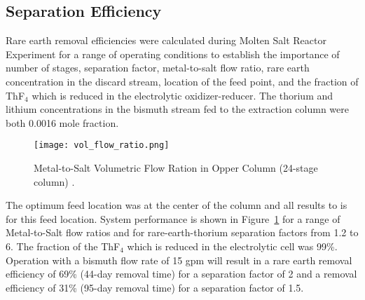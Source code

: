 \subsection{Separation Efficiency}
Rare earth removal efficiencies were calculated during Molten Salt Reactor Experiment for a range of operating conditions to establish the importance of number of stages, separation factor, metal-to-salt flow ratio, rare earth concentration in the discard stream, location of the feed point, and the fraction of ThF$_4$ which is reduced in the electrolytic oxidizer-reducer. The thorium and lithium concentrations in the bismuth stream fed to the extraction column were both 0.0016 mole fraction. 
\begin{figure}[htbp!]
    \begin{center}
        \texttt{[image: vol\_flow\_ratio.png]}
    \end{center}
    \caption{Metal-to-Salt Volumetric Flow Ration in Opper Column (24-stage column) \cite{briggs_molten-salt_1969}.}
    \label{fig:vol-flow-ratio}
\end{figure}

The optimum feed location was at the center of the column and all results to is for this feed
location. System performance is shown in Figure~\ref{fig:vol-flow-ratio} for a range of Metal-to-Salt flow ratios and for rare-earth-thorium separation factors from 1.2 to 6. The fraction of the ThF$_4$ which is reduced in the electrolytic cell was 99\%. Operation with a bismuth flow rate of 15 gpm will result in a rare earth removal efficiency of 69\% (44-day removal time) for a separation factor of 2 and a removal efficiency of 31\% (95-day removal time) for a separation factor of 1.5.

